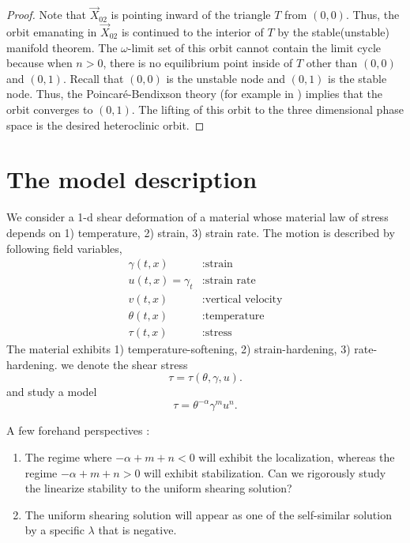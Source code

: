 \documentclass[a4paper,11pt]{article}
\def\red{\color{red}}
\def\blue{\color{blue}}
\begin{document}
\begin{proof}
\medskip

Note that $\vec{X}_{02}$ is pointing inward of the triangle $T$ from $(0,0)$. Thus, the orbit emanating in $\vec{X}_{02}$ is continued to the interior of $T$ by the stable(unstable) manifold theorem. The $\omega$-limit set of this orbit cannot contain the limit cycle because when $n>0$, there is no equilibrium point inside of $T$ other than $(0,0)$ and $(0,1)$. Recall that $(0,0)$ is the unstable node and $(0,1)$ is the stable node. Thus, the Poincar\'e-Bendixson theory (for example in \cite{perko_differential_2001}) implies that the orbit converges to $(0,1)$.  The lifting of this orbit to the three dimensional phase space is the desired heteroclinic orbit. %
\end{proof}




\section{The model description}
We consider a 1-d shear deformation of a material whose material law of stress depends on 1) temperature, 2) strain, 3) strain rate. The motion is described by following field variables,
\begin{equation} \label{eq:vars}
\begin{aligned}
 \gamma(t,x) &: \text{strain}\\
 u(t,x)=\gamma_t &: \text{strain rate}\\
 v(t,x) &: \text{vertical velocity}\\
 \theta(t,x) &: \text{temperature}\\
 \tau(t,x) &: \text{stress}
\end{aligned}
\end{equation}
The material exhibits 1) temperature-softening, 2) strain-hardening, 3) rate-hardening. we denote the shear stress
$$ \tau = \tau(\theta,\gamma,u). $$
and study a model
\begin{equation}
 \tau = \theta^{-\alpha}\gamma^m u^n. \label{eq:stresslaw}
\end{equation}

A few forehand perspectives :
\begin{enumerate}
 \item The regime where $-\alpha+m+n <0$ will exhibit the localization, whereas the regime $-\alpha+m+n > 0$ will exhibit stabilization. {\blue Can we rigorously study the linearize stability to the uniform shearing solution?}
 \item The uniform shearing solution will appear as one of the self-similar solution by a specific $\lambda$ that is negative.
\end{enumerate}
\end{document}
